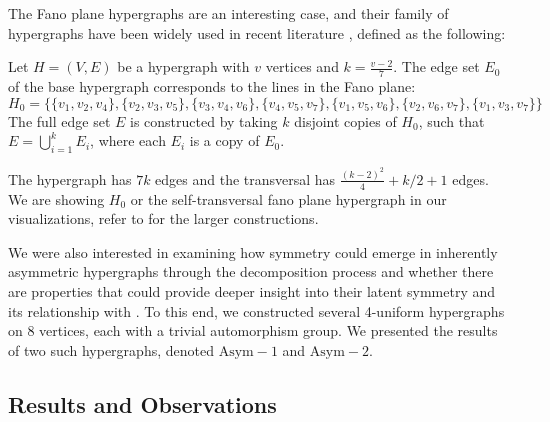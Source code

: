 The Fano plane hypergraphs are an interesting case, and their family of hypergraphs have been widely used in recent literature \cite{Uno24}, \cite{missing-3} defined as the following:

\begin{definition}
Let $H=(V,E)$ be a hypergraph with $v$ vertices and $k=\frac{v-2}{7}$. The edge set $E_0$ of the base hypergraph corresponds to the lines in the Fano plane:
\[
H_0=\{\{v_1,v_2,v_4\},\{v_2,v_3,v_5\},\{v_3,v_4,v_6\},\{v_4,v_5,v_7\},\{v_1,v_5,v_6\},\{v_2,v_6,v_7\},\{v_1,v_3,v_7\}\}
\]
The full edge set $E$ is constructed by taking $k$ disjoint copies of $H_0$, such that $E=\bigcup_{i=1}^{k}E_i$, where each $E_i$ is a copy of $E_0$.
\end{definition}

The hypergraph has $7k$ edges and the transversal has $\frac{(k-2)^2}{4}+k/2+1$ edges. We are showing $H_0$ or the self-transversal fano plane hypergraph in our visualizations, refer to \cite{Uno24} for the larger constructions.

We were also interested in examining how symmetry could emerge in inherently asymmetric hypergraphs through the decomposition process and whether there are properties that could provide deeper insight into their latent symmetry and its relationship with \FKA. To this end, we constructed several 4-uniform hypergraphs on 8 vertices, each with a trivial automorphism group. We presented the results of two such hypergraphs, denoted $\mathrm{Asym}-1$ and $\mathrm{Asym}-2$.

\subsection{Results and Observations}


